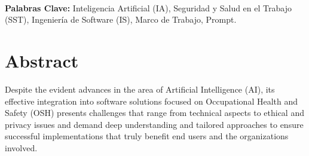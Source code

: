 






\paragraph*{}{\textbf{Palabras Clave:}}
Inteligencia Artificial (IA), Seguridad y Salud en el Trabajo (SST), Ingenier\'ia de Software (IS), Marco de Trabajo, Prompt.

\section*{Abstract}
Despite the evident advances in the area of Artificial Intelligence (AI), its effective integration into software solutions focused on Occupational Health and Safety (OSH) presents challenges that range from technical aspects to ethical and privacy issues and demand deep understanding and tailored approaches to ensure successful implementations that truly benefit end users and the organizations involved.

